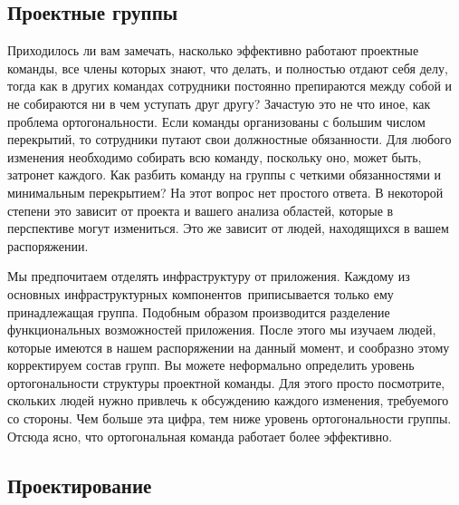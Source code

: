 \subsection{Проектные группы}

Приходилось ли вам замечать, насколько эффективно работают проектные команды,
все члены которых знают, что делать, и полностью отдают себя делу, тогда как в
других командах сотрудники постоянно препираются между собой и не собираются ни
в чем уступать друг другу? Зачастую это не что иное, как проблема
ортогональности. Если команды организованы с большим числом перекрытий, то
сотрудники путают свои должностные обязанности. Для любого изменения необходимо
собирать всю команду, поскольку оно, может быть, затронет каждого. Как разбить
команду на группы с четкими обязанностями и минимальным перекрытием? На этот
вопрос нет простого ответа. В некоторой степени это зависит от проекта и вашего
анализа областей, которые в перспективе могут измениться. Это же зависит от
людей, находящихся в вашем распоряжении. 

Мы предпочитаем отделять инфраструктуру от приложения. Каждому из основных
инфраструктурных компонентов\ приписывается только ему принадлежащая группа.
Подобным образом производится разделение функциональных возможностей приложения.
После этого мы изучаем людей, которые имеются в нашем распоряжении на данный
момент, и сообразно этому
корректируем состав групп. Вы можете неформально определить уровень
ортогональности структуры проектной команды. Для этого просто посмотрите,
скольких людей нужно привлечь к обсуждению каждого изменения, требуемого со
стороны. Чем больше эта цифра, тем ниже уровень ортогональности группы. Отсюда
ясно, что ортогональная команда работает более эффективно.

\subsection{Проектирование}

